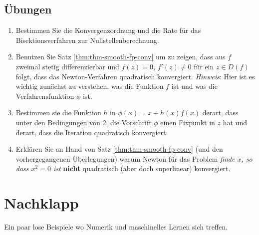 \documentclass[
]{book}
\theoremstyle{definition}
\theoremstyle{definition}
\theoremstyle{definition}
\theoremstyle{definition}
\theoremstyle{remark}
\begin{document}
\hypertarget{uxfcbungen-2}{%
\section{Übungen}\label{uxfcbungen-2}}

\begin{enumerate}
\def\labelenumi{\arabic{enumi}.}
\item
  Bestimmen Sie die Konvergenzordnung und die Rate für das Bisektionsverfahren zur Nullstellenberechnung.
\item
  Benutzen Sie Satz \ref{thm:thm-smooth-fp-conv} um zu zeigen, dass aus \(f\) zweimal stetig differenzierbar und \(f(z)=0\), \(f'(z)\neq 0\) für ein \(z\in D(f)\) folgt, dass das Newton-Verfahren quadratisch konvergiert. \emph{Hinweis}: Hier ist es wichtig zunächst zu verstehen, was die Funktion \(f\) ist und was die Verfahrensfunktion \(\phi\) ist.
\item
  Bestimmen sie die Funktion \(h\) in \(\phi(x) = x+h(x)f(x)\) derart, dass unter den Bedingungen von 2. die Vorschrift \(\phi\) einen Fixpunkt in \(z\) hat und derart, dass die Iteration quadratisch konvergiert.
\item
  Erklären Sie an Hand von Satz \ref{thm:thm-smooth-fp-conv} (und den vorhergegangenen Überlegungen) warum Newton für das Problem \emph{finde \(x\), so dass \(x^2=0\) ist} \textbf{nicht} quadratisch (aber doch superlinear) konvergiert.
\end{enumerate}

\hypertarget{nachklapp}{%
\chapter{Nachklapp}\label{nachklapp}}

Ein paar lose Beispiele wo Numerik und maschinelles Lernen sich treffen.
\end{document}
